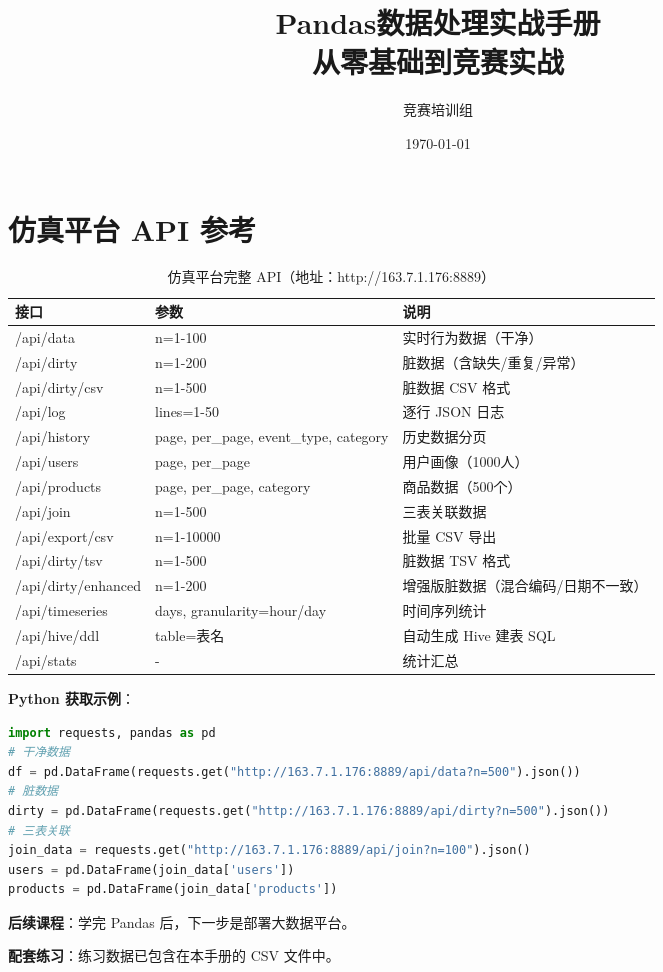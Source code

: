 \documentclass[12pt,a4paper]{article}
\title{\textbf{Pandas数据处理实战手册}\\[0.5em]\large 从零基础到竞赛实战}
\author{竞赛培训组}
\date{\today}
\begin{document}
\maketitle

\section*{仿真平台 API 参考}

\begin{table}[H]
\centering
\caption{仿真平台完整 API（地址：http://163.7.1.176:8889）}
{\footnotesize
\begin{tabular}{lll}
\toprule
\textbf{接口} & \textbf{参数} & \textbf{说明} \\
\midrule
/api/data & n=1-100 & 实时行为数据（干净） \\
/api/dirty & n=1-200 & 脏数据（含缺失/重复/异常） \\
/api/dirty/csv & n=1-500 & 脏数据 CSV 格式 \\
/api/log & lines=1-50 & 逐行 JSON 日志 \\
/api/history & page, per\_page, event\_type, category & 历史数据分页 \\
/api/users & page, per\_page & 用户画像（1000人） \\
/api/products & page, per\_page, category & 商品数据（500个） \\
/api/join & n=1-500 & 三表关联数据 \\
/api/export/csv & n=1-10000 & 批量 CSV 导出 \\
/api/dirty/tsv & n=1-500 & 脏数据 TSV 格式 \\
/api/dirty/enhanced & n=1-200 & 增强版脏数据（混合编码/日期不一致） \\
/api/timeseries & days, granularity=hour/day & 时间序列统计 \\
/api/hive/ddl & table=表名 & 自动生成 Hive 建表 SQL \\
/api/stats & - & 统计汇总 \\
\bottomrule
\end{tabular}
}
\end{table}

\textbf{Python 获取示例}：
\begin{lstlisting}[language=Python]
import requests, pandas as pd
# 干净数据
df = pd.DataFrame(requests.get("http://163.7.1.176:8889/api/data?n=500").json())
# 脏数据
dirty = pd.DataFrame(requests.get("http://163.7.1.176:8889/api/dirty?n=500").json())
# 三表关联
join_data = requests.get("http://163.7.1.176:8889/api/join?n=100").json()
users = pd.DataFrame(join_data['users'])
products = pd.DataFrame(join_data['products'])
\end{lstlisting}
\begin{tipbox}[学习指引]
\textbf{后续课程}：学完 Pandas 后，下一步是部署大数据平台。

\textbf{配套练习}：练习数据已包含在本手册的 CSV 文件中。
\end{tipbox}
\end{document}
